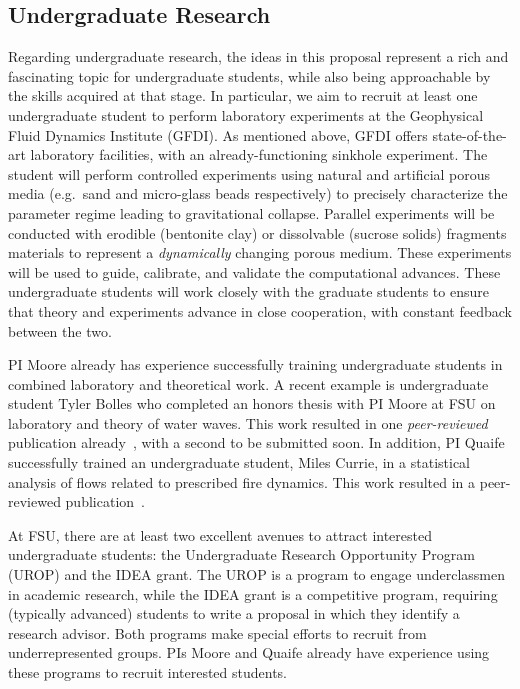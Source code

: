 \documentclass[11pt]{article}
\begin{document}
\subsection{Undergraduate Research}
Regarding undergraduate research, the ideas in this proposal represent a rich and fascinating topic for undergraduate students, while also being approachable by the skills acquired at that stage. In particular, we aim to recruit at least one undergraduate student to perform laboratory experiments at the Geophysical Fluid Dynamics Institute (GFDI). As mentioned above, GFDI offers state-of-the-art laboratory facilities, with an already-functioning sinkhole experiment. The student will perform controlled experiments using natural and artificial porous media (e.g.~sand and micro-glass beads respectively) to precisely characterize the parameter regime leading to gravitational collapse. Parallel experiments will be conducted with erodible (bentonite clay) or dissolvable  (sucrose solids) fragments materials to represent a {\em dynamically} changing porous medium. These experiments will be used to guide, calibrate, and validate the computational advances. These undergraduate students will work closely with the graduate students to ensure that theory and experiments advance in close cooperation, with constant feedback between the two.

PI Moore already has experience successfully training undergraduate students in combined laboratory and theoretical work. A recent example is undergraduate student Tyler Bolles who completed an honors thesis with PI Moore at FSU on laboratory and theory of water waves. This work resulted in one {\em peer-reviewed} publication already~\cite{Bolles2019}, with a second to be submitted soon. In addition, PI Quaife successfully trained an undergraduate student, Miles Currie, in a statistical analysis of flows related to prescribed fire dynamics.  This work resulted in a peer-reviewed publication~\cite{cur-spe-hie-obr-goo-qua2018}.

At FSU, there are at least two excellent avenues to attract interested undergraduate students:  the Undergraduate Research Opportunity Program (UROP) and the IDEA grant. The UROP is a program to engage underclassmen in academic research, while the IDEA grant is a competitive program, requiring (typically advanced) students to write a proposal in which they identify a research advisor. Both programs make special efforts to recruit from underrepresented groups. PIs Moore and Quaife already have experience using these programs to recruit interested students.
\end{document}
